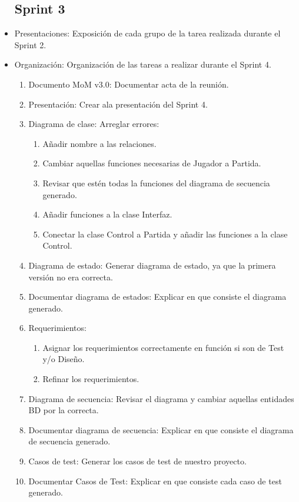\begin{itemize}
\subsection{Sprint 3}
\item Presentaciones: Exposición de cada grupo de la tarea realizada durante el Sprint 2.
\item Organización: Organización de las tareas a realizar durante el Sprint 4.
\begin{enumerate}
	\item Documento MoM v3.0: Documentar acta de la reunión.
	\item Presentación: Crear ala presentación del Sprint 4.
	\item Diagrama de clase:	 Arreglar errores:
	\begin{enumerate}
		\item Añadir nombre a las relaciones.
		\item Cambiar aquellas funciones necesarias de Jugador a Partida.
		\item Revisar que estén todas la funciones del diagrama de secuencia generado.
		\item Añadir funciones a la clase Interfaz.
		\item Conectar la clase Control a Partida y añadir las funciones a la clase Control.
	\end{enumerate}
	\item Diagrama de estado: Generar diagrama de estado, ya que la primera versión no era correcta.
	\item Documentar diagrama de estados: Explicar en que consiste el diagrama generado.
	\item Requerimientos:
	\begin{enumerate}
		\item Asignar los requerimientos correctamente en función si son de Test y/o Diseño.
		\item Refinar los requerimientos.
	\end{enumerate}
	\item Diagrama de secuencia: Revisar el diagrama y cambiar aquellas entidades BD por la correcta.
	\item Documentar diagrama de secuencia: Explicar en que consiste el diagrama de secuencia generado.
	\item Casos de test: Generar los casos de test de nuestro proyecto.
	\item Documentar Casos de Test: Explicar en que consiste cada caso de test generado.
\end{enumerate}



\end{itemize}
